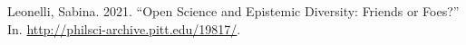 \documentclass{article}
\newlength{\cslhangindent}
\newlength{\cslentryspacingunit} %
\newenvironment{CSLReferences}[2] %
 {%
  \setlength{\parindent}{0pt}
  \ifodd #1
  \let\oldpar\par
  \def\par{\hangindent=\cslhangindent\oldpar}
  \fi
  \setlength{\parskip}{#2\cslentryspacingunit}
 }%
 {}
\begin{document}
\hypertarget{refs}{}
\begin{CSLReferences}{1}{0}
\leavevmode\hypertarget{ref-pittphilsci19817}{}%
Leonelli, Sabina. 2021. {``Open Science and Epistemic Diversity: Friends
or Foes?''} In. \url{http://philsci-archive.pitt.edu/19817/}.

\end{CSLReferences}



\end{document}
